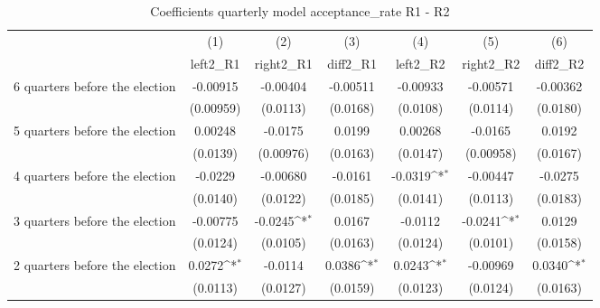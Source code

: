 \begin{table}[htbp]\centering
\def\sym#1{\ifmmode^{#1}\else\(^{#1}\)\fi}
\caption{Coefficients quarterly model acceptance\_rate R1 - R2}
\begin{tabular}{l*{6}{c}}
\hline\hline
                    &\multicolumn{1}{c}{(1)}&\multicolumn{1}{c}{(2)}&\multicolumn{1}{c}{(3)}&\multicolumn{1}{c}{(4)}&\multicolumn{1}{c}{(5)}&\multicolumn{1}{c}{(6)}\\
                    &\multicolumn{1}{c}{left2\_R1}&\multicolumn{1}{c}{right2\_R1}&\multicolumn{1}{c}{diff2\_R1}&\multicolumn{1}{c}{left2\_R2}&\multicolumn{1}{c}{right2\_R2}&\multicolumn{1}{c}{diff2\_R2}\\
\hline
 6 quarters before the election&    -0.00915         &    -0.00404         &    -0.00511         &    -0.00933         &    -0.00571         &    -0.00362         \\
                    &   (0.00959)         &    (0.0113)         &    (0.0168)         &    (0.0108)         &    (0.0114)         &    (0.0180)         \\
[1em]
 5 quarters before the election&     0.00248         &     -0.0175         &      0.0199         &     0.00268         &     -0.0165         &      0.0192         \\
                    &    (0.0139)         &   (0.00976)         &    (0.0163)         &    (0.0147)         &   (0.00958)         &    (0.0167)         \\
[1em]
 4 quarters before the election&     -0.0229         &    -0.00680         &     -0.0161         &     -0.0319\sym{*}  &    -0.00447         &     -0.0275         \\
                    &    (0.0140)         &    (0.0122)         &    (0.0185)         &    (0.0141)         &    (0.0113)         &    (0.0183)         \\
[1em]
 3 quarters before the election&    -0.00775         &     -0.0245\sym{*}  &      0.0167         &     -0.0112         &     -0.0241\sym{*}  &      0.0129         \\
                    &    (0.0124)         &    (0.0105)         &    (0.0163)         &    (0.0124)         &    (0.0101)         &    (0.0158)         \\
[1em]
 2 quarters before the election&      0.0272\sym{*}  &     -0.0114         &      0.0386\sym{*}  &      0.0243\sym{*}  &    -0.00969         &      0.0340\sym{*}  \\
                    &    (0.0113)         &    (0.0127)         &    (0.0159)         &    (0.0123)         &    (0.0124)         &    (0.0163)         \\

\end{tabular}
\end{table}

